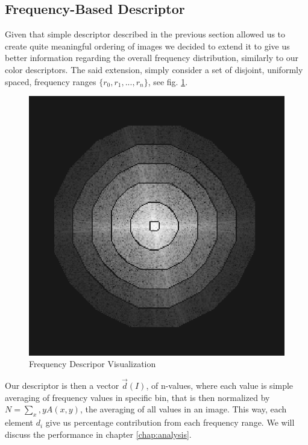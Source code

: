\documentclass{report}
\begin{document}
\subsection{Frequency-Based Descriptor}
\label{sec:freqDescriptor}
Given that simple descriptor described in the previous section allowed us to create quite meaningful ordering of images we decided to extend it to give us better information regarding the overall frequency distribution, similarly to our color descriptors. The said extension, simply consider a set of disjoint, uniformly spaced, frequency ranges $\{r_0, r_1, ..., r_n\}$, see fig. \ref{fig:freqDescriptor}.   
\begin{figure}[hbtp]
\centering
\includegraphics[scale=0.3]{graphics/freq_bins.png}
\caption{Frequency Descripor Visualization}
\label{fig:freqDescriptor}
\end{figure}

Our descriptor is then a vector $\vec{d}(I)$, of n-values, where each value is simple averaging of frequency values in specific bin, that is then normalized by $N = \sum_x,y A(x,y)$, the averaging of all values in an image. This way, each element $d_i$ give us percentage contribution from each frequency range. We will discuss the performance in chapter \ref{chap:analysis}.\\
\end{document}
